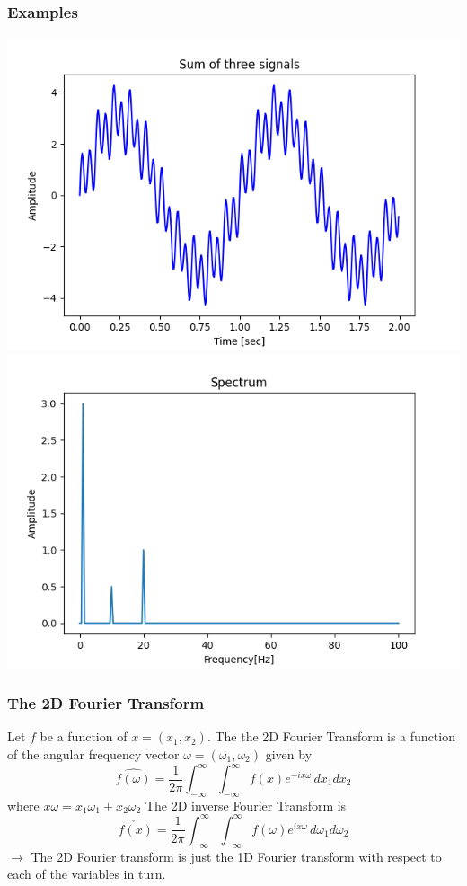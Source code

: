 \documentclass{beamer}
\begin{document}
\begin{frame}
	\frametitle{Examples}
\includegraphics[scale = 0.35]{media/signal3.png}
\includegraphics[scale = 0.35]{media/fourier3.png}	
\end{frame}
\begin{frame}
	\frametitle{The 2D Fourier Transform}
	Let $f$ be a function of $x = (x_1,x_2)$. The the 2D Fourier Transform is a function of the angular frequency vector $\omega = (\omega_{1},\omega_{2})$ given by 
	$$ \hat{f(\omega)} = \frac{1}{2\pi}\int_{-\infty}^{\infty} \int_{-\infty}^{\infty}f(x)e^{-ix\omega} \, dx_{1}dx_{2}$$ 
	where $ x\omega = x_1\omega_{1} + x_2 \omega_{2}$
\newline 
		 \pause
The 2D inverse Fourier Transform is
	$$ \check{f(x)} = \frac{1}{2\pi}\int_{-\infty}^{\infty} \int_{-\infty}^{\infty}f(\omega)e^{ix\omega} \, d\omega_{1} d\omega_{2}$$
	$\rightarrow$ The 2D Fourier transform is just the 1D Fourier transform with respect to each of the variables in turn.
\end{frame}
\end{document}
